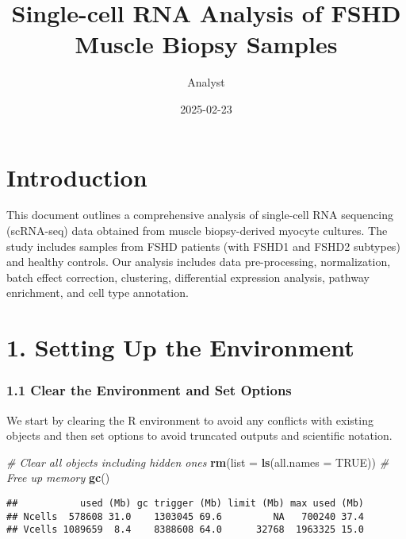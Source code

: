 \documentclass[
]{article}
\title{Single-cell RNA Analysis of FSHD Muscle Biopsy Samples}
\author{Analyst}
\date{2025-02-23}
\newenvironment{Shaded}{\begin{snugshade}}{\end{snugshade}}
\newcommand{\AttributeTok}[1]{\textcolor[rgb]{0.13,0.29,0.53}{#1}}
\newcommand{\CommentTok}[1]{\textcolor[rgb]{0.56,0.35,0.01}{\textit{#1}}}
\newcommand{\ConstantTok}[1]{\textcolor[rgb]{0.56,0.35,0.01}{#1}}
\newcommand{\FunctionTok}[1]{\textcolor[rgb]{0.13,0.29,0.53}{\textbf{#1}}}
\newcommand{\NormalTok}[1]{#1}
\begin{document}
\maketitle

{
\setcounter{tocdepth}{2}
\tableofcontents
}
\section{Introduction}\label{introduction}

This document outlines a comprehensive analysis of single-cell RNA
sequencing (scRNA-seq) data obtained from muscle biopsy-derived myocyte
cultures. The study includes samples from FSHD patients (with FSHD1 and
FSHD2 subtypes) and healthy controls. Our analysis includes data
pre-processing, normalization, batch effect correction, clustering,
differential expression analysis, pathway enrichment, and cell type
annotation.

\section{1. Setting Up the
Environment}\label{setting-up-the-environment}

\subsubsection{1.1 Clear the Environment and Set
Options}\label{clear-the-environment-and-set-options}

We start by clearing the R environment to avoid any conflicts with
existing objects and then set options to avoid truncated outputs and
scientific notation.

\begin{Shaded}
\begin{Highlighting}[]
\CommentTok{\# Clear all objects including hidden ones}
\FunctionTok{rm}\NormalTok{(}\AttributeTok{list =} \FunctionTok{ls}\NormalTok{(}\AttributeTok{all.names =} \ConstantTok{TRUE}\NormalTok{))}
\CommentTok{\# Free up memory}
\FunctionTok{gc}\NormalTok{()}
\end{Highlighting}
\end{Shaded}

\begin{verbatim}
##           used (Mb) gc trigger (Mb) limit (Mb) max used (Mb)
## Ncells  578608 31.0    1303045 69.6         NA   700240 37.4
## Vcells 1089659  8.4    8388608 64.0      32768  1963325 15.0
\end{verbatim}
\end{document}
